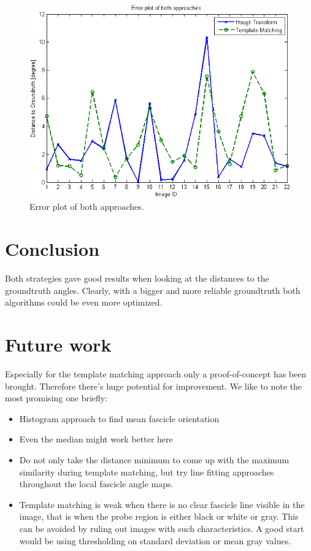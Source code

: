 \documentclass[10pt,twocolumn,letterpaper]{article}
\begin{document}
\begin{figure}
	\begin{center}		
		\includegraphics[width=1\linewidth]{img/ErrorPlot2}
	\end{center}
	\caption{Error plot of both approaches.}
	\label{fig:errorPlot}
	
\end{figure}


\section{Conclusion}
Both strategies gave good results when looking at the distances to the groundtruth angles. Clearly, with a bigger and more reliable groundtruth both algorithms could be even more optimized.

\section{Future work}
\label{sec:future}
Especially for the template matching approach only a proof-of-concept has been brought. Therefore there's huge potential for improvement. We like to note the most promising one briefly:

\begin{itemize}
	\item Histogram approach to find mean fascicle orientation
	\item Even the median might work better here
	\item Do not only take the distance minimum to come up with the maximum similarity during template matching, but try line fitting approaches throughout the local fascicle angle maps.
	\item Template matching is weak when there is no clear fascicle line visible in the image, that is when the probe region is either black or white or gray. This can be avoided by ruling out images with such characteristics. A good start would be using thresholding on standard deviation or mean gray values.
\end{itemize}
	

{\small


}
\end{document}
